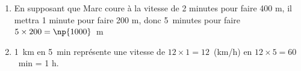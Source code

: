 \documentclass[10pt]{article}
\begin{document}
\setlength\parindent{0mm}
\pagestyle{fancy}
\thispagestyle{empty}
    
    
    




\medskip


\smallskip

%
%

\begin{enumerate}
\item %
En supposant que Marc coure  à la vitesse de 2 minutes pour faire 400 m, il mettra 1 minute pour faire 200 m, donc 5~minutes pour faire $5 \times 200 = \np{1000}$~m
\item %
1~km en 5~min représente une vitesse de $12 \times 1 = 12$~(km/h) en $12 \times 5 = 60$~min = 1 h. 
\end{enumerate}

\end{document}
